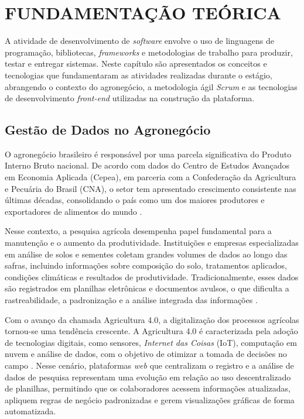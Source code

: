 \chapter{\MakeUppercase{Fundamentação Teórica}}

A atividade de desenvolvimento de \textit{software} envolve o uso de linguagens de programação, bibliotecas, \textit{frameworks} e metodologias de trabalho para produzir, testar e entregar sistemas. Neste capítulo são apresentados os conceitos e tecnologias que fundamentaram as atividades realizadas durante o estágio, abrangendo o contexto do agronegócio, a metodologia ágil \textit{Scrum} e as tecnologias de desenvolvimento \textit{front-end} utilizadas na construção da plataforma.

\section{Gestão de Dados no Agronegócio}

O agronegócio brasileiro é responsável por uma parcela significativa do Produto Interno Bruto nacional. De acordo com dados do Centro de Estudos Avançados em Economia Aplicada (Cepea), em parceria com a Confederação da Agricultura e Pecuária do Brasil (CNA), o setor tem apresentado crescimento consistente nas últimas décadas, consolidando o país como um dos maiores produtores e exportadores de alimentos do mundo \cite{CepeaCNA2025}.

Nesse contexto, a pesquisa agrícola desempenha papel fundamental para a manutenção e o aumento da produtividade. Instituições e empresas especializadas em análise de solos e sementes coletam grandes volumes de dados ao longo das safras, incluindo informações sobre composição do solo, tratamentos aplicados, condições climáticas e resultados de produtividade. Tradicionalmente, esses dados são registrados em planilhas eletrônicas e documentos avulsos, o que dificulta a rastreabilidade, a padronização e a análise integrada das informações \cite{Embrapa2019}.

Com o avanço da chamada Agricultura 4.0, a digitalização dos processos agrícolas tornou-se uma tendência crescente. A Agricultura 4.0 é caracterizada pela adoção de tecnologias digitais, como sensores, \textit{Internet das Coisas} (IoT), computação em nuvem e análise de dados, com o objetivo de otimizar a tomada de decisões no campo \cite{Massruha2020}. Nesse cenário, plataformas \textit{web} que centralizam o registro e a análise de dados de pesquisa representam uma evolução em relação ao uso descentralizado de planilhas, permitindo que os colaboradores acessem informações atualizadas, apliquem regras de negócio padronizadas e gerem visualizações gráficas de forma automatizada.

